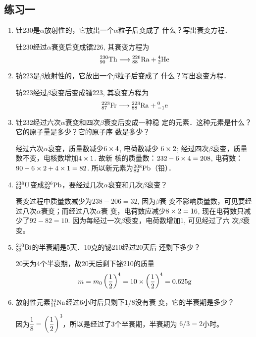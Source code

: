 \subsection{练习一}
\begin{enumerate}
    \item 钍230是$\alpha$放射性的，它放出一个$\alpha$粒子后变成了
什么？写出衰变方程．


\begin{solution}
    钍230经过$\alpha$衰变后变成镭226, 其衰变方程为
    \[\atom{Th}{230}{90}\longrightarrow \atom{Ra}{226}{88}+\atom{He}{4}{2}\]
\end{solution}
\item 钫223是$\beta$放射性的，它放出一个$\beta$粒子后变成了
什么？写出衰变方程．


\begin{solution}
    钫223经过$\beta$衰变后变成镭223, 其衰变方程为
    \[\atom{Fr}{223}{87}\longrightarrow \atom{Ra}{223}{88}+\atom{e}{0}{-1}\]
\end{solution}
\item 钍232经过六次$\alpha$衰变和四次$\beta$衰变后变成一种稳
定的元素．这种元素是什么？它的原子量是多少？它的原子序
数是多少？


\begin{solution}
    经过六次$\alpha$衰变，质量数减少$6\x4$, 电荷数减少
    $6\x2$; 经过四次$\beta$衰变，质量数不变，电核数增加$4\x1$. 故新
    核的质量数：$232-6\x4=208$, 
    电荷数：$90-6\x2+4\x1=82$. 
    所以新元素为$\atom{Pb}{208}{82}$（铅）．
\end{solution}
\item 
$\atom{U}{238}{92}$变成$\atom{Pb}{206}{82}$，要经过几次$\alpha$衰变和几次$\beta$衰变？

\begin{solution}
    衰变过程中质量数减少为$238-206=32$, 因为$\beta$衰
    变不影响质量数，可见要经过八次$\alpha$衰变；而经过八次$\alpha$衰
    变，电荷数应减少$8\x2=16$, 现在电荷数只减少了$92-82
    =10$. 因为每经过一次$\beta$衰变，电荷数增加1, 可见经过了六
    次$\beta$衰变。
\end{solution}
\item 
$\atom{Bi}{210}{83}$的半衰期是5天．10克的铋210经过20天后
还剩下多少？


\begin{solution}
    20天为4个半衰期，故20天后剩下铋210的质量
\[m=m_0\left(\frac{1}{2}\right)^4=10\x \left(\frac{1}{2}\right)^4=0.625{\rm g}\]
\end{solution}
\item 放射性元素$\atom{Na}{24}{11}$经过6小时后只剩下1/8没有衰
变，它的半衰期是多少？


\begin{solution}
因为$\dfrac{1}{8}=\left(\dfrac{1}{2}\right)^3$，所以是经过了3个半衰期，半衰期为
$6/3=2$小时。
\end{solution}
\end{enumerate}




